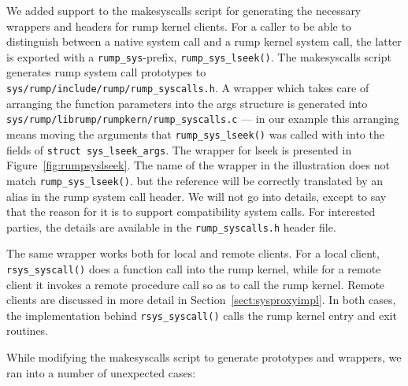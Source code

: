 We added support to the makesyscalls script for generating the necessary
wrappers and headers for rump kernel clients.  For a caller to be
able to distinguish between a native system call and a rump kernel
system call, the latter is exported with a \verb+rump_sys+-prefix, \eg
\verb+rump_sys_lseek()+.  The makesyscalls script generates
rump system call prototypes to
\verb+sys/rump/include/rump/rump_syscalls.h+.  A wrapper which
takes care of arranging the function parameters into the args
structure is generated into
\verb+sys/rump/librump/rumpkern/rump_syscalls.c+ --- in our example
this arranging means moving the arguments that \verb+rump_sys_lseek()+ was
called with into the fields of \verb+struct sys_lseek_args+.  The
wrapper for lseek is presented in Figure~\ref{fig:rumpsyslseek}.
The name of the wrapper in the illustration does not match
\verb+rump_sys_lseek()+.
but the reference will be correctly translated by an alias
in the rump system call header.  We will not go into details,
except to say that the reason for it is to support compatibility
system calls.  For interested parties, the details are available in
the \verb+rump_syscalls.h+ header file.

The same wrapper works both for local and remote clients.  For a
local client, \verb+rsys_syscall()+ does a function call into the
rump kernel, while for a remote client it invokes a remote procedure
call so as to call the rump kernel.  Remote clients are discussed
in more detail in Section~\ref{sect:sysproxyimpl}.  In both cases,
the implementation behind \verb+rsys_syscall()+ calls the rump
kernel entry and exit routines.

While modifying the makesyscalls script to generate prototypes and
wrappers, we ran into a number of unexpected cases:

